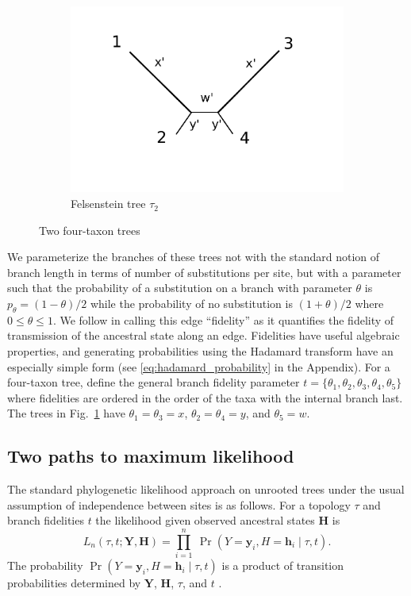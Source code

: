 \documentclass{article}
\newcommand{\fullAlignment}{\mathbf{Y}}
\newcommand{\alignmentColumn}{\mathbf{y}}
\newcommand{\alignmentColumnRV}{Y}
\newcommand{\fullAncestralStates}{\mathbf{H}}
\newcommand{\ancestralStateColumn}{\mathbf{h}}
\newcommand{\ancestralStateColumnRV}{H}
\newcommand{\nCols}{n}
\begin{document}
\begin{figure}
\begin{subfigure}{.45\linewidth}
\includegraphics[width=.95\textwidth]{felsenstein_blank}
\caption[short]{Felsenstein tree $\tau_2$}
\end{subfigure}
\caption{Two four-taxon trees}
\label{fig:farris-fels-top}
\end{figure}

We parameterize the branches of these trees not with the standard notion of branch length in terms of number of substitutions per site, but with a parameter such that the probability of a substitution on a branch with parameter $\theta$ is $p_\theta = (1-\theta)/2$ while the probability of no substitution is $(1+\theta)/2$ where $0 \le \theta \le 1$.
We follow \cite{Matsen2007-jq} in calling this edge ``fidelity'' as it quantifies the fidelity of transmission of the ancestral state along an edge.
Fidelities have useful algebraic properties, and generating probabilities using the Hadamard transform have an especially simple form (see \eqref{eq:hadamard_probability} in the Appendix).
For a four-taxon tree, define the general branch fidelity parameter $t=\{\theta_1,\theta_2,\theta_3,\theta_4,\theta_5\}$ where fidelities are ordered in the order of the taxa with the internal branch last.
The trees in Fig.~\ref{fig:farris-fels-top} have $\theta_1=\theta_3=x$, $\theta_2=\theta_4=y$, and $\theta_5=w$.

\subsection*{Two paths to maximum likelihood}

The standard phylogenetic likelihood approach on unrooted trees under the usual assumption of independence between sites is as follows.
For a topology $\tau$ and branch fidelities $t$ the likelihood given observed ancestral states $\fullAncestralStates$ is
\begin{equation}
\label{eq:full_likelihood}
L_\nCols(\tau, t; \fullAlignment,\fullAncestralStates) = \prod_{i=1}^{\nCols} \ \Pr(\alignmentColumnRV=\alignmentColumn_i, \ancestralStateColumnRV=\ancestralStateColumn_i \mid \tau, t).
\end{equation}
The probability $\Pr(\alignmentColumnRV=\alignmentColumn_i, \ancestralStateColumnRV=\ancestralStateColumn_i \mid \tau, t)$ is a product of transition probabilities determined by $\fullAlignment$, $\fullAncestralStates$, $\tau$, and $t$ \cite{Felsenstein2004}.
\end{document}
